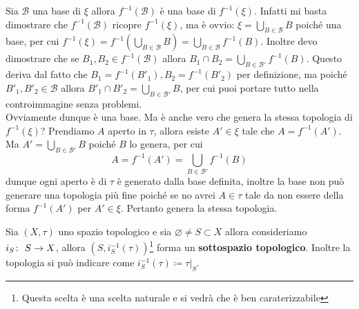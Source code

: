 \begin{remark}
	\label{remark:induced_bases_by_a_map}
	Sia $\mathcal{B}$ una base di $\xi$ allora $f^{-1}(\mathcal{B})$ è una base di $f^{-1}(\xi)$. Infatti mi basta dimostrare che $f^{-1}(\mathcal{B})$ ricopre $f^{-1}(\xi)$, ma è ovvio: $\xi = \bigcup_{B \in \mathcal{B}} B$ poiché una base, per cui $f^{-1}(\xi) = f^{-1}(\bigcup_{B \in \mathcal{B}} B) = \bigcup_{B \in \mathcal{B}} f^{-1}(B)$. Inoltre devo dimostrare che se $B_1, B_2 \in f^{-1}(\mathcal{B})$ allora $B_1 \cap B_2 = \bigcup_{B \in \mathcal{B}'}f^{-1}(B)$. Questo deriva dal fatto che $B_1 = f^{-1}(B'_1), B_2 = f^{-1}(B'_2)$ per definizione, ma poiché $B'_1, B'_2 \in \mathcal{B}$ allora $B'_1 \cap B'_2 = \bigcup_{B \in \mathcal{B}'} B$, per cui puoi portare tutto nella controimmagine senza problemi. \\
	
	Ovviamente dunque è una base. Ma è anche vero che genera la stessa topologia di $f^{-1}(\xi)$? Prendiamo $A$ aperto in $\tau$, allora esiste $A' \in \xi$ tale che $A = f^{-1}(A')$. Ma $A' = \bigcup_{B \in \mathcal{B}'} B$ poiché $B$ lo genera, per cui
	\begin{equation*}
		A = f^{-1}(A') = \bigcup_{B \in \mathcal{B}'} f^{-1}(B) 
	\end{equation*}
	dunque ogni aperto è di $\tau$ è generato dalla base definita, inoltre la base non può generare una topologia più fine poiché se no avrei $A \in \tau$ tale da non essere della forma $f^{-1}(A')$ per $A' \in \xi$. Pertanto genera la stessa topologia.
\end{remark}

\begin{definition}
	Sia $(X,\tau)$ uno spazio topologico e sia $\varnothing \neq S \subset X$ allora consideriamo $i_S \colon\ S \rightarrow X$, allora $(S, i^{-1}_S(\tau))$\footnote{Questa scelta è una scelta naturale e si vedrà che è ben caraterizzabile} forma un \textbf{sottospazio topologico}. Inoltre la topologia si può indicare come $i^{-1}_S(\tau) \coloneqq \tau|_S$. 
\end{definition}


